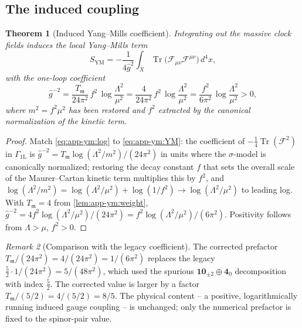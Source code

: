 \documentclass[11pt]{article}
\theoremstyle{plain}
\newtheorem{theorem}{Theorem}[section]
\theoremstyle{definition}
\theoremstyle{remark}
\newtheorem{remark}[theorem]{Remark}
\newcommand{\Tr}{\operatorname{Tr}}
\newcommand{\ghat}{\hat g}
\begin{document}
\subsection{The induced coupling}
\label{sec:app-ym:coupling}

\begin{theorem}[Induced Yang--Mills coefficient]
\label{thm:app-ym:coupling}
Integrating out the massive clock fields induces the local Yang--Mills
term
\begin{equation}\label{eq:app-ym:YM}
  S_{\mathrm{YM}}
  =-\frac{1}{4\ghat^{2}}\int_{X}
    \Tr\bigl(\mathcal F_{\mu\nu}\mathcal F^{\mu\nu}\bigr)\,d^{4}x ,
\end{equation}
with the one-loop coefficient
\begin{equation}\label{eq:app-ym:ghat}
  \ghat^{-2}
  =\frac{T_{\mathfrak m}}{24\pi^{2}}\,f^{2}\,
   \log\frac{\Lambda^{2}}{\mu^{2}}
  =\frac{4}{24\pi^{2}}\,f^{2}\,\log\frac{\Lambda^{2}}{\mu^{2}}
  =\frac{f^{2}}{6\pi^{2}}\,\log\frac{\Lambda^{2}}{\mu^{2}}
  >0 ,
\end{equation}
where $m^{2}=f^{2}\mu^{2}$ has been restored and $f^{2}$ extracted by
the canonical normalization of the kinetic term.
\end{theorem}

\begin{proof}
Match \eqref{eq:app-ym:log} to \eqref{eq:app-ym:YM}: the coefficient of
$-\tfrac14\Tr(\mathcal F^{2})$ in $\Gamma_{\mathrm{1L}}$ is
$\ghat^{-2}=T_{\mathfrak m}\log(\Lambda^{2}/m^{2})/(24\pi^{2})$ in units
where the $\sigma$-model is canonically normalized; restoring the decay
constant $f$ that sets the overall scale of the Maurer--Cartan kinetic
term multiplies this by $f^{2}$, and $\log(\Lambda^{2}/m^{2})
=\log(\Lambda^{2}/\mu^{2})+\log(1/f^{2})\to\log(\Lambda^{2}/\mu^{2})$ to
leading log. With $T_{\mathfrak m}=4$ from \autoref{lem:app-ym:weight},
$\ghat^{-2}=4f^{2}\log(\Lambda^{2}/\mu^{2})/(24\pi^{2})
=f^{2}\log(\Lambda^{2}/\mu^{2})/(6\pi^{2})$. Positivity follows from
$\Lambda>\mu$, $f^{2}>0$.
\end{proof}

\begin{remark}[Comparison with the legacy coefficient]
\label{rem:app-ym:legacy}
The corrected prefactor $T_{\mathfrak m}/(24\pi^{2})=4/(24\pi^{2})
=1/(6\pi^{2})$ replaces the legacy
$\tfrac52\cdot 1/(24\pi^{2})=5/(48\pi^{2})$, which used the spurious
$\mathbf{10}_{\pm2}\oplus\mathbf 4_{0}$ decomposition with index
$\tfrac52$. The corrected value is larger by a factor
$T_{\mathfrak m}/(5/2)=4/(5/2)=8/5$. The physical content -- a
positive, logarithmically running induced gauge coupling -- is unchanged;
only the numerical prefactor is fixed to the spinor-pair value.
\end{remark}
\end{document}
